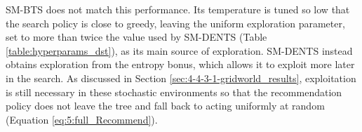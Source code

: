     SM-BTS does not match this performance. Its temperature is tuned so low that the search policy is close to greedy, leaving the uniform exploration parameter, set to more than twice the value used by SM-DENTS (Table \ref{table:hyperparams_dst}), as its main source of exploration. SM-DENTS instead obtains exploration from the entropy bonus, which allows it to exploit more later in the search. As discussed in Section \ref{sec:4-4-3-1-gridworld_results}, exploitation is still necessary in these stochastic environments so that the recommendation policy does not leave the tree and fall back to acting uniformly at random (Equation \eqref{eq:5:full_Recommend}).




